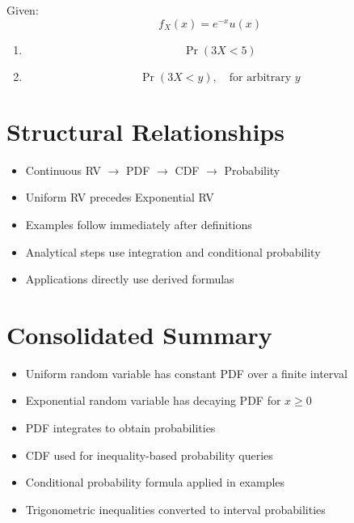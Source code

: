 \documentclass[12pt]{article}
\begin{document}
Given:
\[
f_X(x)=e^{-x}u(x)
\]

\begin{enumerate}[label=(\alph*)]
    \item
    \[
    \Pr(3X<5)
    \]

    \item
    \[
    \Pr(3X<y), \quad \text{for arbitrary } y
    \]
\end{enumerate}

\newpage

\section{Structural Relationships}

\begin{itemize}
    \item Continuous RV $\rightarrow$ PDF $\rightarrow$ CDF $\rightarrow$ Probability
    \item Uniform RV precedes Exponential RV
    \item Examples follow immediately after definitions
    \item Analytical steps use integration and conditional probability
    \item Applications directly use derived formulas
\end{itemize}

\newpage

\section{Consolidated Summary}

\begin{itemize}
    \item Uniform random variable has constant PDF over a finite interval
    \item Exponential random variable has decaying PDF for $x \ge 0$
    \item PDF integrates to obtain probabilities
    \item CDF used for inequality-based probability queries
    \item Conditional probability formula applied in examples
    \item Trigonometric inequalities converted to interval probabilities
\end{itemize}
\end{document}
